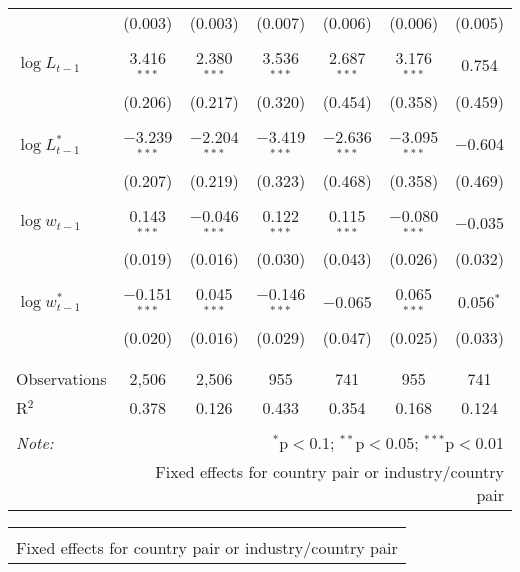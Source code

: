 \begin{tabular}{@{\extracolsep{5pt}}lcccccc}
  & (0.003) & (0.003) & (0.007) & (0.006) & (0.006) & (0.005) \\ 
  & & & & & & \\ 
 $\log L_{t-1}$ & 3.416$^{***}$ & 2.380$^{***}$ & 3.536$^{***}$ & 2.687$^{***}$ & 3.176$^{***}$ & 0.754 \\ 
  & (0.206) & (0.217) & (0.320) & (0.454) & (0.358) & (0.459) \\ 
  & & & & & & \\ 
 $\log L_{t-1}^*$ & $-$3.239$^{***}$ & $-$2.204$^{***}$ & $-$3.419$^{***}$ & $-$2.636$^{***}$ & $-$3.095$^{***}$ & $-$0.604 \\ 
  & (0.207) & (0.219) & (0.323) & (0.468) & (0.358) & (0.469) \\ 
  & & & & & & \\ 
 $\log w_{t-1}$ & 0.143$^{***}$ & $-$0.046$^{***}$ & 0.122$^{***}$ & 0.115$^{***}$ & $-$0.080$^{***}$ & $-$0.035 \\ 
  & (0.019) & (0.016) & (0.030) & (0.043) & (0.026) & (0.032) \\ 
  & & & & & & \\ 
 $\log w_{t-1}^*$ & $-$0.151$^{***}$ & 0.045$^{***}$ & $-$0.146$^{***}$ & $-$0.065 & 0.065$^{***}$ & 0.056$^{*}$ \\ 
  & (0.020) & (0.016) & (0.029) & (0.047) & (0.025) & (0.033) \\ 
  & & & & & & \\ 
\hline \\[-1.8ex] 
Observations & 2,506 & 2,506 & 955 & 741 & 955 & 741 \\ 
R$^{2}$ & 0.378 & 0.126 & 0.433 & 0.354 & 0.168 & 0.124 \\ 
\hline 
\hline \\[-1.8ex] 
\textit{Note:}  & \multicolumn{6}{r}{$^{*}$p$<$0.1; $^{**}$p$<$0.05; $^{***}$p$<$0.01} \\ 
 & \multicolumn{6}{r}{Fixed effects for country pair or industry/country pair} \\ 
\end{tabular} 

\begin{tabular}{@{\extracolsep{5pt}} c} 
\\[-1.8ex]\hline 
\hline \\[-1.8ex] 
\multicolumn{1}{l}{Fixed effects for country pair or industry/country pair} \\ 
\end{tabular} 